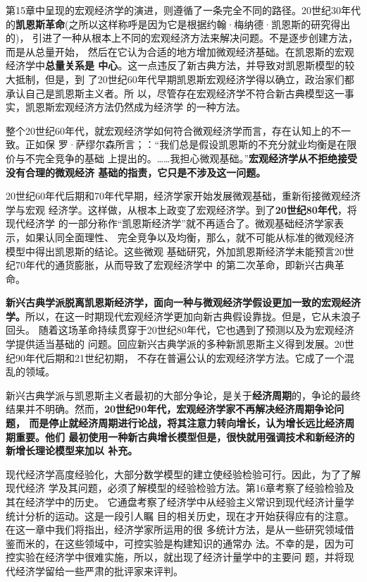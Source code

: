 第15章中呈现的宏观经济学的演进，则遵循了一条完全不同的路径。20世纪30年代
的\textbf{凯恩斯革命}(之所以这样称呼是因为它是根据约翰·梅纳德·凯恩斯的研究得出的)，
引进了一种从根本上不同的宏观经济方法来解决问题。不是逐步创建方法，而是从总量开始，
然后在它认为合适的地方增加微观经济基础。在凯恩斯的宏观经济学中\textbf{总量关系是
  中心}。这一点违反了新古典方法，并导致对凯恩斯模型的较大抵制，但是，到
了20世纪60年代早期凯恩斯宏观经济学得以确立，政治家们都承认自己是凯恩斯主义者。所
以，尽管存在宏观经济学不符合新古典模型这一事实，凯恩斯宏观经济方法仍然成为经济学
的一种方法。

整个20世纪60年代，就宏观经济学如何符合微观经济学而言，存在认知上的不一致。正如保
罗·萨缪尔森所言；：“我们总是假设凯恩斯的不充分就业均衡是在限价与不完全竞争的基础
上提出的。……我担心微观基础。”\textbf{宏观经济学从不拒绝接受没有合理的微观经济
  基础的指责，它只是不涉及这一问题。}

20世纪60年代后期和70年代早期，经济学家开始发展微观基础，重新衔接微观经济学与宏观
经济学。这样做，从根本上政变了宏观经济学。到了\textbf{20世纪80年代}，将现代经济学
的一部分称作“凯恩斯经济学”就不再适合了。微观基础经济学家表示，如果认同全面理性、
完全竞争以及均衡，那么，就不可能从标准的微观经济模型中得出凯恩斯的结论。这些微观
基础研究，外加凯恩斯经济学未能预言20世纪70年代的通货膨胀，从而导致了宏观经济学中
的第二次革命，即新兴古典革命。

\textbf{新兴古典学派脱离凯恩斯经济学，面向一种与微观经济学假设更加一致的宏观经济
  学。}所以，在这一时期现代宏观经济学更加向新古典假设靠拢。但是，它从未浪子回头。
随着这场革命持续贯穿于20世纪80年代，它也遇到了预测以及为宏观经济学提供适当基础的
问题。回应新兴古典学派的多种新凯恩斯主义得到发展。20世纪90年代后期和21世纪初期，
不存在普遍公认的宏观经济学方法。它成了一个混乱的领域。

新兴古典学派与凯恩斯主义者最初的大部分争论，是关于\textbf{经济周期}的，争论的最终
结果并不明确。然而，\textbf{20世纪90年代，宏观经济学家不再解决经济周期争论问题，
  而是停止就经济周期进行论战，将其注意力转向增长，认为增长远比经济周期重要。他们
  最初使用一种新古典增长模型但是，很快就用强调技术和新经济的新增长理论模型来加以
  补充。}

现代经济学高度经验化，大部分数学模型的建立使经验检验可行。因此，为了了解现代经济
学及其问题，必须了解模型的经验检验方法。第16章考察了经验检验及其在经济学中的历史。
它通盘考察了经济学中从经验主义常识到现代经济计量学统计分析的运动。这是一段引人瞩
目的相关历史，现在才开始获得应有的注意。在这一章中我们将指出，经济学家所运用的很
多统计方法，是从一些研究领域借鉴而米的，在这些领域中，可控实验是构建知识的通常办
法。不幸的是，因为可控实验在经济学中很难实施，所以，就出现了经济计量学中的主要问
题，并将现代经济学留给一些严肃的批评家来评判。

